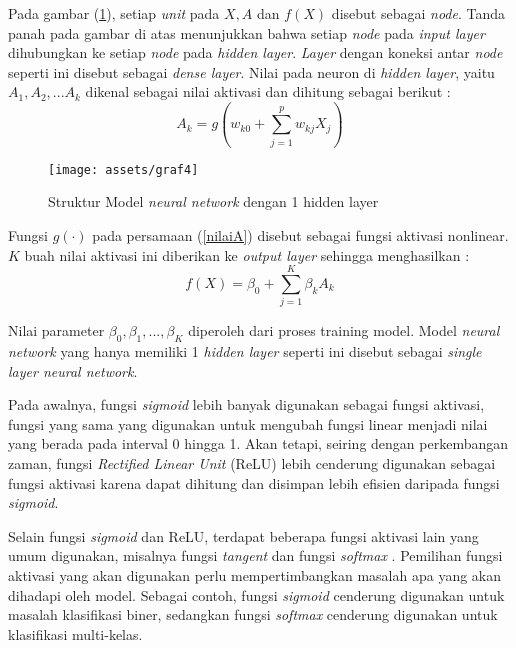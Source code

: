 \documentclass[a4paper,12pt]{report}
\begin{document}
Pada gambar (\ref{NN1layer}), setiap \textit{unit} pada $X, A$ dan $f(X)$ disebut sebagai \textit{node}. Tanda panah pada gambar di atas menunjukkan bahwa setiap \textit{node} pada \textit{input layer} dihubungkan ke setiap \textit{node} pada \textit{hidden layer}. \textit{Layer} dengan koneksi antar \textit{node} seperti ini disebut sebagai \textit{dense layer}. Nilai pada neuron di \textit{hidden layer}, yaitu $A_{1}, A_{2}, ... A_{k}$ dikenal sebagai nilai aktivasi dan dihitung sebagai berikut :
\begin{equation}
	A_{k}= g\left(w_{k0} + \sum\limits_{j=1}^{p}w_{kj}X_{j}\right)
	\label{nilaiA}
\end{equation}

\begin{figure}[H]
	\center \texttt{[image: assets/graf4]}
	\caption{Struktur Model \textit{neural network} dengan 1 hidden layer} 
	\label{NN1layer}
\end{figure}
Fungsi $g(\cdot)$ pada persamaan (\ref{nilaiA}) disebut sebagai fungsi aktivasi nonlinear. $K$ buah nilai aktivasi ini diberikan ke \textit{output layer} sehingga menghasilkan :
\begin{equation}
	f(X) = \beta_{0} + \sum\limits_{j=1}^{K}\beta_{k}A_{k}
\end{equation}

Nilai parameter $\beta_{0}, \beta_{1}, ..., \beta_{K}$ diperoleh dari proses training model. Model \textit{neural network} yang hanya memiliki 1 \textit{hidden layer} seperti ini disebut sebagai \textit{single layer neural network}. 

Pada awalnya, fungsi \textit{sigmoid} lebih banyak digunakan sebagai fungsi aktivasi, fungsi yang sama yang digunakan untuk mengubah fungsi linear menjadi nilai yang berada pada interval 0 hingga 1. Akan tetapi, seiring dengan perkembangan zaman, fungsi \textit{Rectified Linear Unit} (ReLU) lebih cenderung digunakan sebagai fungsi aktivasi karena dapat dihitung dan disimpan lebih efisien daripada fungsi \textit{sigmoid}. 

Selain fungsi \textit{sigmoid} dan ReLU, terdapat beberapa fungsi aktivasi lain yang umum digunakan, misalnya fungsi \textit{tangent} dan fungsi \textit{softmax} \cite{vinayakumarDeepLearningApproach2019}. Pemilihan fungsi aktivasi yang akan digunakan perlu mempertimbangkan masalah apa yang akan dihadapi oleh model. Sebagai contoh, fungsi \textit{sigmoid} cenderung digunakan untuk masalah klasifikasi biner, sedangkan fungsi \textit{softmax} cenderung digunakan untuk klasifikasi multi-kelas.
\end{document}
